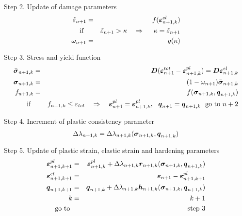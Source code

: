 Step 2. Update of damage parameters
\begin{eqnarray}
\tilde{\varepsilon}_{n+1} &=& f(\mbf{\varepsilon}_{n+1,k}^{el})
\\
{\rm if}\ & & \tilde{\varepsilon}_{n+1} > \kappa\ \ \ \Rightarrow \ \ \ \ \kappa=\tilde{\varepsilon}_{n+1}
\\
\omega_{n+1} &=& g(\kappa)
\end{eqnarray}

Step 3. Stress and yield function
\begin{eqnarray}
\bar{\mbf{\sigma}}_{n+1,k} &=& \mbf{D} (\mbf{\varepsilon}_{n+1}^{tot} - \mbf{\varepsilon}_{n+1,k}^{pl}) = \mbf{D} \mbf{\varepsilon}_{n+1,k}^{el}
\\
\mbf{\sigma}_{n+1,k} &=& (1-\omega_{n+1}) \bar{\mbf{\sigma}}_{n+1,k}
\\
f_{n+1,k} &=& f(\mbf{\sigma}_{n+1,k}, \mbf{q}_{n+1,k})
\\
{\rm if}\ & & f_{n+1,k}\leq \varepsilon_{tol}\ \ \ \Rightarrow \ \ \ \mbf{\varepsilon}_{n+1}^{pl} = \mbf{\varepsilon}_{n+1,k}^{pl},\ \ \mbf{q}_{n+1} = \mbf{q}_{n+1,k}\ \ {\rm go\ to}\ n+2
\end{eqnarray}

Step 4. Increment of plastic consistency parameter
\begin{eqnarray}
\Delta \lambda_{n+1,k} = \Delta \lambda_{n+1,k} (\mbox{\boldmath$\sigma$}_{n+1,k}, \mbox{\boldmath$q$}_{n+1,k})
\end{eqnarray}

Step 5. Update of plastic strain, elastic strain and hardening parameters
\begin{eqnarray}
\mbox{\boldmath$\varepsilon$}_{n+1,k+1}^{pl} &=& \mbox{\boldmath$\varepsilon$}_{n+1,k}^{pl} + \Delta \lambda_{n+1,k} \mbox{\boldmath$r$}_{n+1,k} (\mbox{\boldmath$\sigma$}_{n+1,k}, \mbox{\boldmath$q$}_{n+1,k})
\\
\mbox{\boldmath$\varepsilon$}_{n+1,k+1}^{el} &=& \mbox{\boldmath$\varepsilon$}_{n+1} - \mbox{\boldmath$\varepsilon$}_{n+1,k+1}^{pl}
\\
\mbox{\boldmath$q$}_{n+1,k+1} &=& \mbox{\boldmath$q$}_{n+1,k} + \Delta \lambda_{n+1,k} \mbox{\boldmath$h$}_{n+1,k} (\mbox{\boldmath$\sigma$}_{n+1,k}, \mbox{\boldmath$q$}_{n+1,k})
\\
k &=& k+1
\\
{\rm go\ to\ } & & {\rm step\ 3}
\end{eqnarray}
